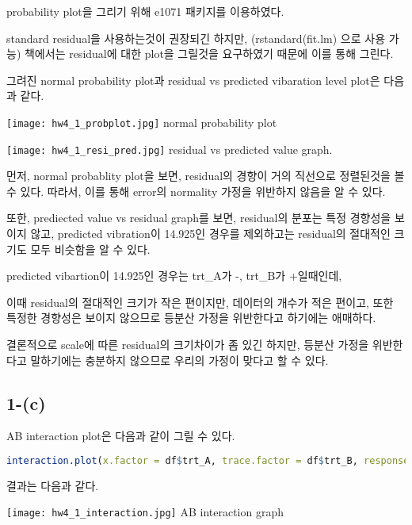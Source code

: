 \documentclass{article}
\begin{document}
probability plot을 그리기 위해 e1071 패키지를 이용하였다.

standard residual을 사용하는것이 권장되긴 하지만, (rstandard(fit.lm) 으로 사용 가능)
책에서는 residual에 대한 plot을 그릴것을 요구하였기 때문에 이를 통해 그린다.

그려진 normal probability plot과 residual vs predicted vibaration level plot은 다음과 같다.

\begin{center}
    \texttt{[image: hw4\_1\_probplot.jpg]}
normal probability plot
\end{center} 

\begin{center}
    \texttt{[image: hw4\_1\_resi\_pred.jpg]}
residual vs predicted value graph.
\end{center} 

먼저, normal probablity plot을 보면, residual의 경향이 거의 직선으로 정렬된것을 볼 수 있다.
따라서, 이를 통해 error의 normality 가정을 위반하지 않음을 알 수 있다.


또한, prediected value vs residual graph를 보면, residual의 분포는 특정 경향성을 보이지 않고,
predicted vibration이 14.925인 경우를 제외하고는 residual의 절대적인 크기도 모두 비슷함을 알 수 있다.

predicted vibartion이 14.925인 경우는 trt\_A가 -, trt\_B가 +일때인데, 

이때 residual의 절대적인 크기가 작은 편이지만, 데이터의 개수가 적은 편이고, 
또한 특정한 경향성은 보이지 않으므로 등분산 가정을 위반한다고 하기에는 애매하다.

결론적으로 scale에 따른 residual의 크기차이가 좀 있긴 하지만, 등분산 가정을 위반한다고 말하기에는 충분하지 않으므로
우리의 가정이 맞다고 할 수 있다.



\subsection{1-(c)}

AB interaction plot은 다음과 같이 그릴 수 있다.

\begin{lstlisting}[language=R]
interaction.plot(x.factor = df$trt_A, trace.factor = df$trt_B, response = df$y, type = "b", fixed = TRUE, pch = 19, xlab = "trt_A", trace.label = "trt_B",ylab = "mean of vibration")
\end{lstlisting}

결과는 다음과 같다.

\begin{center}
    \texttt{[image: hw4\_1\_interaction.jpg]}
AB interaction graph
\end{center} 
\end{document}
